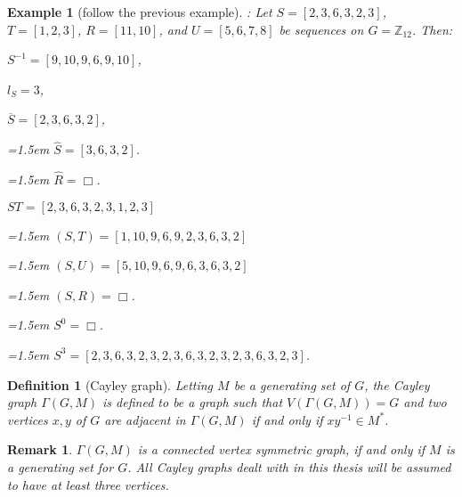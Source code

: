 \documentclass{article}
\newtheorem{remark}{Remark}
\newtheorem{definition}{Definition}
\newtheorem{example}{Example}
\begin{document}
\begin{example}[follow the previous example]:\newline
Let $S = [2, 3, 6, 3, 2, 3]$, $T = [1, 2, 3]$, $R = [11, 10]$, and $U = [5, 6, 7, 8]$ be sequences on $G=\mathbb{Z}_{12}$.
Then:

$S^{-1} = [9, 10, 9, 6, 9, 10]$, 

$l_S = 3$, 

$\overline{S} = [2, 3, 6, 3, 2]$, 

\hangindent=1.5em
$\hat{S} = [3, 6, 3, 2]$.

\hangindent=1.5em
$\hat{R} = \Box$.

$ST = [2, 3, 6, 3, 2, 3, 1, 2, 3]$

\hangindent=1.5em
$(S, T) = [1, 10, 9, 6, 9, 2, 3, 6, 3, 2]$

\hangindent=1.5em
$(S, U) = [5, 10, 9, 6, 9, 6, 3, 6, 3, 2]$

\hangindent=1.5em
$(S, R) =\Box$.

\hangindent=1.5em
$S^{0} =\Box$.

\hangindent=1.5em
$S^{3} = [2, 3, 6, 3, 2, 3, 2, 3, 6, 3, 2, 3, 2, 3, 6, 3, 2, 3]$.
\end{example}

\begin{definition}[Cayley graph] 
Letting $M$ be a generating set of $G$, the \textit{Cayley graph} $\Gamma(G, M)$ is defined to be a graph such that $V(\Gamma(G, M)) = G$ and two vertices $x, y$ of $G$ are adjacent in $\Gamma(G, M)$ if and only if $xy^{-1} \in M^*$. 
\end{definition}
\begin{remark} 
$\Gamma(G, M)$ is a connected vertex symmetric graph, if and only if $M$ is a generating set for $G$. All Cayley graphs dealt with in this thesis will be assumed to have at least three vertices.
\end{remark}
\end{document}
